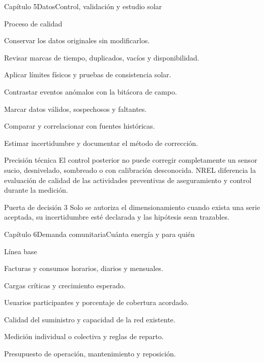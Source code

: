 \documentclass{hvtbook}
\begin{document}
\begin{HVTPage}{Capítulo 5}{Datos}{Control, validación y estudio solar}
\begin{HVTTaskOrdered}{Proceso de calidad}
  \item Conservar los datos originales sin modificarlos.
  \item Revisar marcas de tiempo, duplicados, vacíos y disponibilidad.
  \item Aplicar límites físicos y pruebas de consistencia solar.
  \item Contrastar eventos anómalos con la bitácora de campo.
  \item Marcar datos válidos, sospechosos y faltantes.
  \item Comparar y correlacionar con fuentes históricas.
  \item Estimar incertidumbre y documentar el método de corrección.
\end{HVTTaskOrdered}
\begin{HVTWarning}{Precisión técnica}
El control posterior no puede corregir completamente un sensor sucio, desnivelado, sombreado o con calibración desconocida. NREL diferencia la evaluación de calidad de las actividades preventivas de aseguramiento y control durante la medición. 
\end{HVTWarning}
\begin{HVTWarning}{Puerta de decisión 3}
Solo se autoriza el dimensionamiento cuando exista una serie aceptada, su incertidumbre esté declarada y las hipótesis sean trazables.
\end{HVTWarning}
\end{HVTPage}

\begin{HVTPage}{Capítulo 6}{Demanda comunitaria}{Cuánta energía y para quién}
\begin{HVTTask}{Línea base}
  \item Facturas y consumos horarios, diarios y mensuales.
  \item Cargas críticas y crecimiento esperado.
  \item Usuarios participantes y porcentaje de cobertura acordado.
  \item Calidad del suministro y capacidad de la red existente.
  \item Medición individual o colectiva y reglas de reparto.
  \item Presupuesto de operación, mantenimiento y reposición.
\end{HVTTask}
\end{HVTPage}
\end{document}
